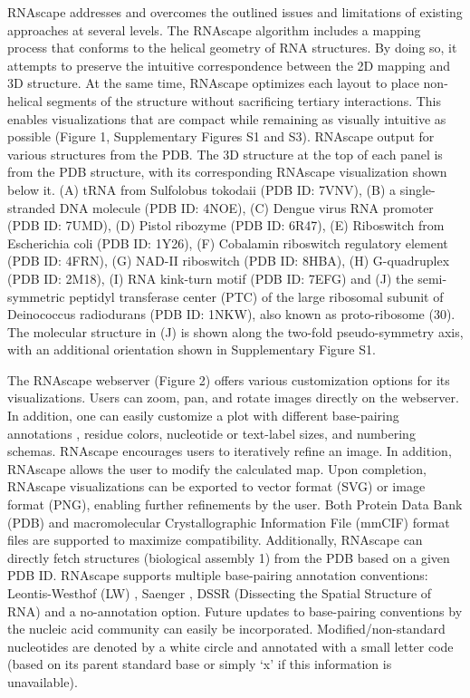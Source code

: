 \par
RNAscape addresses and overcomes the outlined issues and limitations of existing approaches at several levels. The RNAscape algorithm includes a mapping process that conforms to the helical geometry of RNA structures. By doing so, it attempts to preserve the intuitive correspondence between the 2D mapping and 3D structure. At the same time, RNAscape optimizes each layout to place non-helical segments of the structure without sacrificing tertiary interactions. This enables visualizations that are compact while remaining as visually intuitive as possible (Figure 1, Supplementary Figures S1 and S3).
RNAscape output for various structures from the PDB. The 3D structure at the top of each panel is from the PDB structure, with its corresponding RNAscape visualization shown below it. (A) tRNA from Sulfolobus tokodaii (PDB ID: 7VNV), (B) a single-stranded DNA molecule (PDB ID: 4NOE), (C) Dengue virus RNA promoter (PDB ID: 7UMD), (D) Pistol ribozyme (PDB ID: 6R47), (E) Riboswitch from Escherichia coli (PDB ID: 1Y26), (F) Cobalamin riboswitch regulatory element (PDB ID: 4FRN), (G) NAD-II riboswitch (PDB ID: 8HBA), (H) G-quadruplex (PDB ID: 2M18), (I) RNA kink-turn motif (PDB ID: 7EFG) and (J) the semi-symmetric peptidyl transferase center (PTC) of the large ribosomal subunit of Deinococcus radiodurans (PDB ID: 1NKW), also known as proto-ribosome (30). The molecular structure in (J) is shown along the two-fold pseudo-symmetry axis, with an additional orientation shown in Supplementary Figure S1.
\par
The RNAscape webserver (Figure 2) offers various customization options for its visualizations. Users can zoom, pan, and rotate images directly on the webserver. In addition, one can easily customize a plot with different base-pairing annotations \citep{Yang2003, Saenger1984,lu2015dssr}, residue colors, nucleotide or text-label sizes, and numbering schemas. RNAscape encourages users to iteratively refine an image. In addition, RNAscape allows the user to modify the calculated map. Upon completion, RNAscape visualizations can be exported to vector format (SVG) or image format (PNG), enabling further refinements by the user. Both Protein Data Bank (PDB) and macromolecular Crystallographic Information File (mmCIF) format files are supported to maximize compatibility. Additionally, RNAscape can directly fetch structures (biological assembly 1) from the PDB \citep{berman2000protein,} based on a given PDB ID. RNAscape supports multiple base-pairing annotation conventions: Leontis-Westhof (LW) \citep{Yang2003}, Saenger \citep{Saenger1984}, DSSR (Dissecting the Spatial Structure of RNA) \citep{lu2015dssr} and a no-annotation option. Future updates to base-pairing conventions by the nucleic acid community can easily be incorporated. Modified/non-standard nucleotides are denoted by a white circle and annotated with a small letter code (based on its parent standard base or simply ‘x’ if this information is unavailable).
